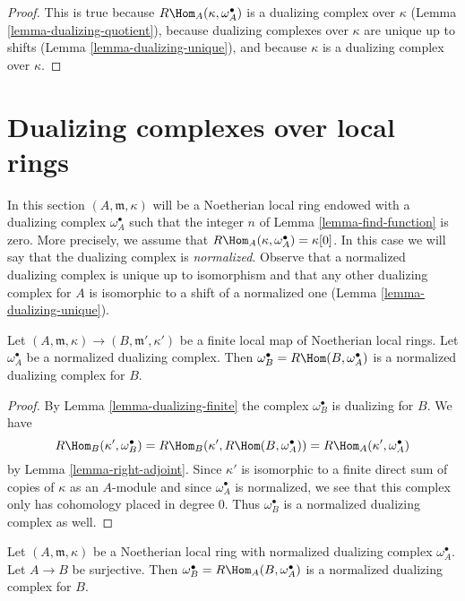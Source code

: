 \begin{proof}
This is true because $R\Hom_A(\kappa, \omega_A^\bullet)$ is a dualizing
complex over $\kappa$ (Lemma \ref{lemma-dualizing-quotient}),
because dualizing complexes over $\kappa$ are unique up to shifts
(Lemma \ref{lemma-dualizing-unique}), and because $\kappa$ is a
dualizing complex over $\kappa$.
\end{proof}




\section{Dualizing complexes over local rings}
\label{section-dualizing-local}

\noindent
In this section $(A, \mathfrak m, \kappa)$ will be a Noetherian local
ring endowed with a dualizing complex $\omega_A^\bullet$ such that
the integer $n$ of Lemma \ref{lemma-find-function} is zero.
More precisely, we assume that $R\Hom_A(\kappa, \omega_A^\bullet) = \kappa[0]$.
In this case we will say that the dualizing complex is {\it normalized}.
Observe that a normalized dualizing complex is unique up to
isomorphism and that any other dualizing complex for $A$ is isomorphic
to a shift of a normalized one (Lemma \ref{lemma-dualizing-unique}).

\begin{lemma}
\label{lemma-normalized-finite}
Let $(A, \mathfrak m, \kappa) \to (B, \mathfrak m', \kappa')$
be a finite local map of Noetherian local rings. Let $\omega_A^\bullet$
be a normalized dualizing complex. Then
$\omega_B^\bullet = R\Hom(B, \omega_A^\bullet)$ is a
normalized dualizing complex for $B$.
\end{lemma}

\begin{proof}
By Lemma \ref{lemma-dualizing-finite} the complex
$\omega_B^\bullet$ is dualizing for $B$. We have
$$
R\Hom_B(\kappa', \omega_B^\bullet) =
R\Hom_B(\kappa', R\Hom(B, \omega_A^\bullet)) =
R\Hom_A(\kappa', \omega_A^\bullet)
$$
by Lemma \ref{lemma-right-adjoint}. Since $\kappa'$ is isomorphic
to a finite direct sum of copies of $\kappa$ as an $A$-module
and since $\omega_A^\bullet$ is normalized, we
see that this complex only has cohomology placed in degree $0$.
Thus $\omega_B^\bullet$ is a normalized dualizing complex as well.
\end{proof}

\begin{lemma}
\label{lemma-normalized-quotient}
Let $(A, \mathfrak m, \kappa)$ be a Noetherian local
ring with normalized dualizing complex $\omega_A^\bullet$.
Let $A \to B$ be surjective. Then
$\omega_B^\bullet = R\Hom_A(B, \omega_A^\bullet)$ is a
normalized dualizing complex for $B$.
\end{lemma}

